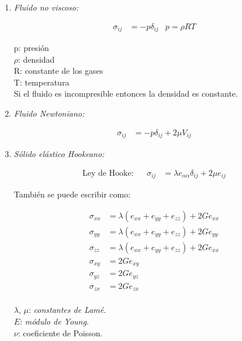 \documentclass[a4paper,10pt,twoside,final,spanish]{article}
\begin{document}
\begin{enumerate}[1.]

\item \textit{Fluido no viscoso:}

\begin{align}
\sigma_{ij} &= -p\delta_{ij} & p=\rho RT
\end{align}

p: presión \\
$\rho$: densidad \\
R: constante de los gases \\
T: temperatura \\

Si el fluido es incompresible entonces la densidad es constante.

\item \textit{Fluido Newtoniano:}

\begin{align}
\sigma_{ij} &= -p\delta_{ij}+2\mu V_{ij}
\end{align}

\item \textit{Sólido elástico Hookeano:}

\begin{align}
\mbox{Ley de Hooke:} && \sigma_{ij} &= \lambda e_{\alpha\alpha}\delta_{ij}+2\mu e_{ij}
\end{align}

También se puede escribir como:

\begin{minipage}[t]{0.5\linewidth}

\begin{align*}
\sigma_{xx} &= \lambda(e_{xx}+e_{yy}+e_{zz})+2Ge_{xx} \\
\sigma_{yy} &= \lambda(e_{xx}+e_{yy}+e_{zz})+2Ge_{yy} \\
\sigma_{zz} &= \lambda(e_{xx}+e_{yy}+e_{zz})+2Ge_{xx} \\
\sigma_{xy} &= 2Ge_{xy} \\
\sigma_{yz} &= 2Ge_{yz} \\
\sigma_{zx} &= 2Ge_{zx} \\
\end{align*}

$\lambda$, $\mu$: \textit{constantes de Lamé}. \\

$E$: \textit{módulo de Young}. \\

$\nu$: coeficiente de Poisson. \\


\end{minipage}
\end{enumerate}
\end{document}
